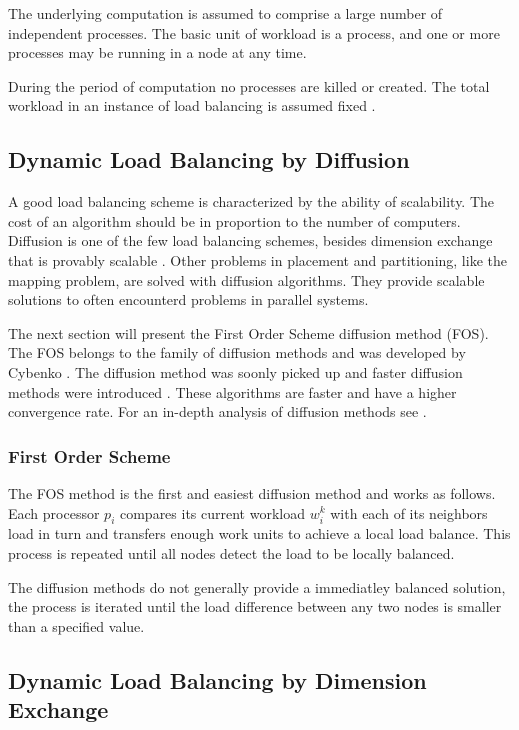 \documentclass[DIV10, abstracton, openright, footsepline, headsepline, twoside, 9pt,
bigheadings]{scrreprt}
\begin{document}
The underlying computation is assumed to comprise a large number of independent
processes. The basic unit of workload is a process, and one or more processes
may be running in a node at any time.

During the period of computation no processes are killed or created. The total
workload in an instance of load balancing is assumed fixed \cite{Hosseini90}
\cite{Xu92}.


\subsection{Dynamic Load Balancing by Diffusion}
A good load balancing scheme is characterized by the ability of scalability.
The cost of an algorithm should be in proportion to the number of computers.
Diffusion is one of the few load balancing schemes, besides dimension exchange
that is provably scalable \cite{Heirich198}. Other problems in placement and
partitioning, like the mapping problem, are solved with diffusion algorithms.
They provide scalable solutions to often encounterd problems in parallel
systems.

The next section will present the First Order Scheme diffusion method (FOS). The
FOS belongs to the family of diffusion methods and was developed by Cybenko
 \cite{Cybenko89}.
The diffusion method was soonly picked up and faster diffusion methods were
introduced \cite{Muthu96}.  These algorithms are faster and have a higher
 convergence rate. For an in-depth analysis of diffusion methods see
\cite{Cybenko89} \cite{Diekmann99} \cite{Diekmann97} \cite{Elsaesser99}.


\subsubsection{First Order Scheme}
The FOS method is the first and easiest diffusion method and works as follows.
Each processor $p_i$ compares its current workload $w_i^k$ with each of its
neighbors load in turn and transfers enough work units to achieve a local load
balance. This process is repeated until all nodes detect the load to be
locally balanced.

The diffusion methods do not generally provide a immediatley balanced solution,
the process is iterated until the load difference between any two nodes is smaller
than a specified value.

\subsection{Dynamic Load Balancing by Dimension Exchange}
\end{document}
